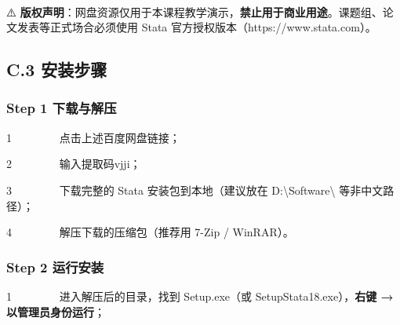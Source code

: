 \documentclass[
  american,
  chinese,
]{ctexart}
\begin{document}
\foreignlanguage{american}{}

~

\foreignlanguage{american}{⚠️
}\textbf{{版权声明}}{：{网盘资源}仅用于本课程教学演示，\textbf{禁止用于商业用途}。课题组、论文发表等正式场合必须使用}\foreignlanguage{american}{ Stata }{官方授权版本（}\foreignlanguage{american}{https://www.stata.com}{）。}\foreignlanguage{american}{}

\subsection{\texorpdfstring{\foreignlanguage{american}{C.3 }{安装步骤}\foreignlanguage{american}{}}{C.3 安装步骤}}\label{c.3-ux5b89ux88c5ux6b65ux9aa4}

\subsubsection{\texorpdfstring{\foreignlanguage{american}{Step 1 }{下载与解压}\foreignlanguage{american}{}}{Step 1 下载与解压}}\label{step-1-ux4e0bux8f7dux4e0eux89e3ux538b}

\foreignlanguage{american}{{1{~~~~~~~~
}}}{点击上述百度{网盘链接}；}\foreignlanguage{american}{}

\foreignlanguage{american}{{2{~~~~~~~~
}}}{\foreignlanguage{american}{输入提取码}}\foreignlanguage{american}{ {{vjji}}}{\foreignlanguage{american}{；}}

\foreignlanguage{american}{{3{~~~~~~~~
}}}{\foreignlanguage{american}{下载完整的}}\foreignlanguage{american}{ Stata }{\foreignlanguage{american}{安装包到本地（建议放在}}\foreignlanguage{american}{ D:\textbackslash Software\textbackslash{} }{\foreignlanguage{american}{等非中文路径}}{\foreignlanguage{american}{）；}}

\foreignlanguage{american}{{4{~~~~~~~~
}}}{\foreignlanguage{american}{解压下载的压缩包（推荐用}}\foreignlanguage{american}{ 7-Zip / WinRAR}\foreignlanguage{american}{）。}

\subsubsection{\texorpdfstring{\foreignlanguage{american}{Step 2 }{\foreignlanguage{american}{运行安装}}}{Step 2 运行安装}}\label{step-2-ux8fd0ux884cux5b89ux88c5}

\foreignlanguage{american}{{1{~~~~~~~~
}}}{\foreignlanguage{american}{进入解压后的目录，找到}}\foreignlanguage{american}{ {Setup.exe{（或}}
SetupStata18.exe}\foreignlanguage{american}{），{\textbf{右键}}}\textbf{\foreignlanguage{american}{ → }}{{\textbf{\foreignlanguage{american}{以管理员身份运行}}}}{\foreignlanguage{american}{；}}
\end{document}
